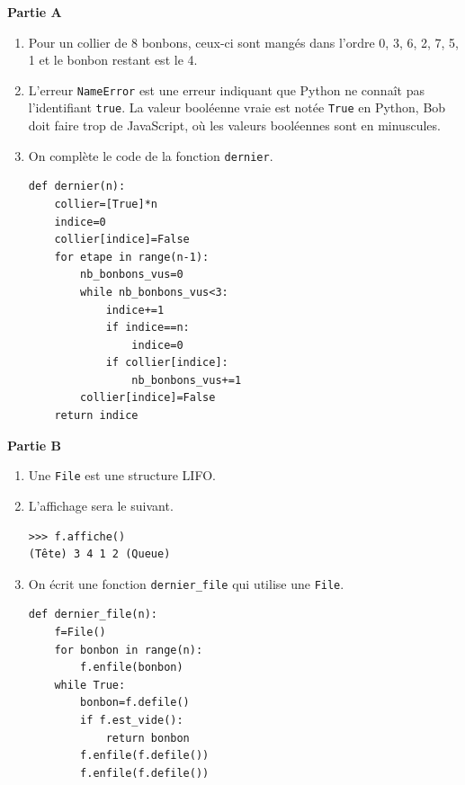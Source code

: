 \documentclass[11pt,a4paper]{article}
\newcommand{\mip}[1]{\texttt{#1}}
\begin{document}
\textbf{Partie A}
\begin{enumerate}
\item Pour un collier de 8 bonbons, ceux-ci sont mangés dans l'ordre 0, 3, 6, 2, 7, 5, 1 et le bonbon restant est le 4.

\item L'erreur \mip{NameError} est une erreur indiquant que Python ne connaît pas l'identifiant \mip{true}. La valeur booléenne vraie est notée \mip{True} en Python, Bob doit faire trop de JavaScript, où les valeurs booléennes sont en minuscules.

\item On complète le code de la fonction \mip{dernier}.

\begin{verbatim}
def dernier(n):
    collier=[True]*n
    indice=0
    collier[indice]=False
    for etape in range(n-1):
        nb_bonbons_vus=0
        while nb_bonbons_vus<3:
            indice+=1
            if indice==n:
                indice=0
            if collier[indice]:
                nb_bonbons_vus+=1
        collier[indice]=False
    return indice    
\end{verbatim}
\end{enumerate}

\vspace{-6.5cm}

\hfill\begin{minipage}{9cm}
\textbf{Partie B}

\begin{enumerate}[resume]
\item Une \mip{File} est une structure LIFO.

\item L'affichage sera le suivant.
\begin{verbatim}
>>> f.affiche()
(Tête) 3 4 1 2 (Queue)
\end{verbatim}

\item On écrit une fonction \mip{dernier_file} qui utilise une \mip{File}.
\begin{verbatim}
def dernier_file(n):
    f=File()
    for bonbon in range(n):
        f.enfile(bonbon)
    while True:
        bonbon=f.defile()
        if f.est_vide():
            return bonbon
        f.enfile(f.defile())
        f.enfile(f.defile())
\end{verbatim}

\end{enumerate}
\end{minipage}
\end{document}
